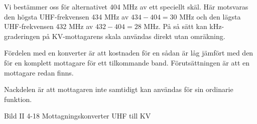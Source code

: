Vi bestämmer oss för alternativet 404 MHz av ett speciellt skäl. Här
motsvaras den högsta UHF-frekvensen 434 MHz av \(434 - 404 = 30\) MHz
och den lägsta UHF-frekvensen 432 MHz av \(432 - 404 = 28\) MHz. På så
sätt kan kHz-graderingen på KV-mottagarens skala användas direkt utan
omräkning.

Fördelen med en konverter är att kostnaden för en sådan är låg jämfört
med den för en komplett mottagare för ett tilkommande
band. Förutsättningen är att en mottagare redan finns.

Nackdelen är att mottagaren inte samtidigt kan användas för sin
ordinarie funktion.

Bild II 4-18 Mottagningskonverter UHF till KV
